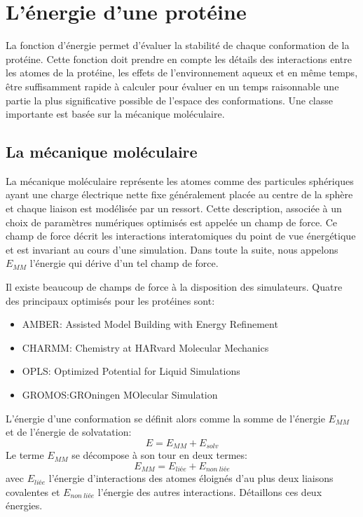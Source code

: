 \section{L'énergie d'une protéine}

La fonction d'énergie permet d'évaluer la stabilité de chaque conformation de la protéine. Cette fonction doit prendre en compte les détails des interactions entre les atomes de la protéine, les effets de l'environnement aqueux et en même temps, être suffisamment rapide à calculer pour évaluer en un temps raisonnable une partie la plus significative possible de l'espace des conformations. Une classe importante est basée sur la mécanique moléculaire.

\subsection{La mécanique moléculaire}
\label{sub:mecamol}
La mécanique moléculaire représente les atomes comme des particules sphériques ayant une charge électrique nette fixe généralement placée au centre de la sphère et chaque liaison est modélisée par un ressort. Cette description, associée à un choix de paramètres numériques optimisés est appelée un champ de force. Ce champ de force décrit les interactions interatomiques du point de vue énergétique et est invariant au cours d'une simulation.
Dans toute la suite, nous appelons $E_{MM}$ l'énergie qui dérive d'un tel champ de force.

Il existe beaucoup de champs de force à la disposition des simulateurs. Quatre des principaux optimisés pour les protéines sont:

\begin{itemize}
\item AMBER: Assisted Model Building with Energy Refinement \cite{Cornell95}
\item CHARMM: Chemistry at HARvard Molecular Mechanics \cite{Brooks09}
\item OPLS: Optimized Potential for Liquid Simulations \cite{Jorgensen88}
\item GROMOS:GROningen MOlecular Simulation \cite{Christen05}
\end{itemize}
L'énergie d'une conformation se définit alors comme la somme de l'énergie $E_{MM}$  et de l'énergie de solvatation:
\begin{equation}
  E = E_{MM} + E_{solv}
\end{equation}
Le terme $E_{MM}$ se décompose à son tour en deux termes:
\begin{equation}
  E_{MM} = E_{liée} + E_{non\ liée}
\end{equation}
avec $E_{liée}$ l'énergie d'interactions des atomes éloignés d'au plus deux liaisons covalentes et $E_{non\ liée}$  l'énergie des autres interactions. Détaillons ces deux énergies.

